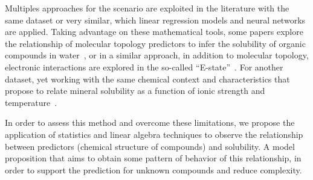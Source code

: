 Multiples approaches for the scenario are exploited in the literature with the same dataset or very similar, which linear regression models and neural networks are applied. Taking advantage on these mathematical tools, some papers explore the relationship of molecular topology predictors to infer the solubility of organic compounds in water~\cite{Artigo1}, or in a similar approach, in addition to molecular topology, electronic interactions are explored in the so-called ``E-state''~\cite{Artigo2}. For another dataset, yet working with the same chemical context and characteristics that propose to relate mineral solubility as a function of ionic strength and temperature~\cite{Artigo3}. 

In order to assess this method and overcome these limitations, we propose the application of statistics and linear algebra techniques to observe the relationship between predictors (chemical structure of compounds) and solubility. A model proposition that aims to obtain some pattern of behavior of this relationship, in order to support the prediction for unknown compounds and reduce complexity. 